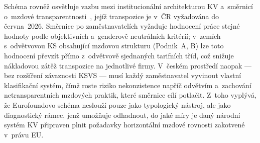 Schéma rovněž osvětluje vazbu mezi institucionální architekturou \ac{KV} a~směrnicí o~mzdové transparentnosti~\cite{smernice_pay_transparency_2023}, jejíž transpozice je v~ČR vyžadována do června~2026.
Směrnice po zaměstnavatelích vyžaduje hodnocení práce stejné hodnoty podle objektivních a~genderově neutrálních kritérií; v~zemích s~odvětvovou \acs{KS} obsahující mzdovou strukturu (Podnik~A, B) lze toto hodnocení převzít přímo z~odvětvově sjednaných tarifních tříd, což snižuje nákladovou zátěž transpozice na jednotlivé firmy.
V~českém prostředí naopak --- bez rozšíření závaznosti \acs{KSVS} --- musí každý zaměstnavatel vyvinout vlastní klasifikační systém, čímž roste riziko nekonzistence napříč odvětvím a~zachování netransparentních mzdových praktik, které směrnice cílí potlačit.
Z~toho vyplývá, že Eurofoundovo schéma neslouží pouze jako typologický nástroj, ale jako diagnostický rámec, jenž umožňuje odhadnout, do jaké míry je daný národní systém \ac{KV} připraven plnit požadavky horizontální mzdové rovnosti zakotvené v~právu \acs{EU}.


